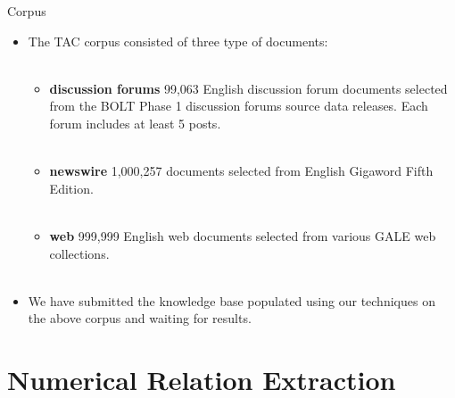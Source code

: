 \documentclass{beamer}
\begin{document}
\begin{frame}{Corpus}
 \begin{itemize}
  \item The TAC corpus consisted of three type of documents: \pause \\~\\
    \begin{itemize}
	\item \textbf{discussion forums } 99,063 English discussion forum documents selected from the BOLT Phase 1 discussion forums source data releases. Each forum includes at least 5 posts. \pause \\~\\

	\item \textbf{newswire } 1,000,257 documents selected from English Gigaword Fifth Edition. \pause \\~\\

	 \item \textbf{web} 999,999 English web documents selected from various GALE web collections. \pause \\~\\
    \end{itemize}
    
      \item We have submitted the knowledge base populated using our techniques on the above corpus and waiting for results.
 \end{itemize}


 
\end{frame}


\section{Numerical Relation Extraction}
\end{document}
